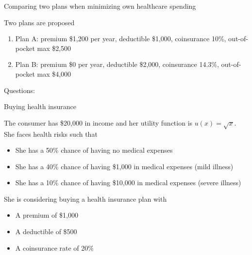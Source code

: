 \begin{frame}{Comparing two plans when minimizing own healthcare spending}

    Two plans are proposed
    \begin{enumerate}
        \item Plan A: premium \$1,200 per year, deductible \$1,000, coinsurance 10\%, out-of-pocket max \$2,500
        \item Plan B: premium \$0 per year, deductible \$2,000, coinsurance 14.3\%, out-of-pocket max \$4,000
    \end{enumerate}
    \vspace{3mm}

    Questions:
    \begin{enumerate}
    \end{enumerate}


\end{frame}
\begin{frame}{Buying health insurance}

    The consumer has \$20,000 in income and her utility function is $u(x) = \sqrt{x}$.\\
    She faces health risks such that
    \begin{itemize}
        \item She has a 50\% chance of having no medical expenses
        \item She has a 40\% chance of having \$1,000 in medical expenses (mild illness)
        \item She has a 10\% chance of having \$10,000 in medical expenses (severe illness)
    \end{itemize}
    \vspace{3mm}

    She is considering buying a health insurance plan with
    \begin{itemize}
        \item A premium of \$1,000
        \item A deductible of \$500
        \item A coinsurance rate of 20\%
    \end{itemize}

\end{frame}
